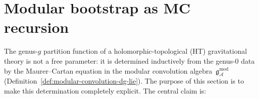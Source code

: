 %

\providecommand{\cA}{\mathcal{A}}
\providecommand{\cH}{\mathcal{H}}
\providecommand{\cM}{\mathcal{M}}
\providecommand{\cC}{\mathcal{C}}
\providecommand{\fg}{\mathfrak{g}}
\providecommand{\fC}{\mathfrak{C}}
\providecommand{\gAmod}{\mathfrak{g}_{\cA}^{\mathrm{mod}}}
\providecommand{\dzero}{d_0}
\providecommand{\dfib}{d_{\mathrm{fib}}}
\providecommand{\MC}{\text{MC}}
\providecommand{\barB}{\overline{B}}
\providecommand{\Defcyc}{\operatorname{Def}_{\mathrm{cyc}}}
\providecommand{\Definfmod}{\operatorname{Def}_{\infty}^{\mathrm{mod}}}
\providecommand{\Convstr}{\operatorname{Conv}_{\mathrm{str}}}
\providecommand{\Convinf}{\operatorname{Conv}_{\infty}}
\providecommand{\Gmod}{\mathcal{G}^{\mathrm{mod}}}
\providecommand{\Tr}{\operatorname{Tr}}
\providecommand{\Hom}{\operatorname{Hom}}
\providecommand{\Res}{\operatorname{Res}}
\providecommand{\id}{\mathrm{id}}
\providecommand{\ad}{\operatorname{ad}}
\providecommand{\gr}{\operatorname{gr}}
\providecommand{\wt}{\operatorname{wt}}
\providecommand{\Aut}{\operatorname{Aut}}
\providecommand{\Det}{\operatorname{Det}}
\providecommand{\Sym}{\operatorname{Sym}}
\providecommand{\Omegach}{\Omega^{\text{ch}}}

\providecommand{\Ob}{\mathrm{Ob}}
\providecommand{\Shad}{\operatorname{Sh}}
\providecommand{\hCont}{\mathsf{h}}
\providecommand{\BVop}{\Delta_{\mathrm{BV}}}
\providecommand{\dsew}{d_{\mathrm{sew}}}
\providecommand{\dpf}{d_{\mathrm{pf}}}

\section{Modular bootstrap as MC recursion}
\label{sec:thqg-modular-bootstrap}

The genus-$g$ partition function of a holomorphic-topological (HT)
gravitational theory is not a free parameter: it is determined
inductively from the genus-$0$ data by the Maurer--Cartan equation
in the modular convolution algebra~$\gAmod$
(Definition~\ref{def:modular-convolution-dg-lie}). The purpose
of this section is to make this determination completely explicit.
The central claim is:

